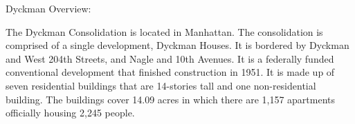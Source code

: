 Dyckman Overview: 

  

The Dyckman Consolidation is located in Manhattan. The consolidation is comprised of a single development, Dyckman Houses. It is bordered by Dyckman and West 204th Streets, and Nagle and 10th Avenues. It is a federally funded conventional development that finished construction in 1951. It is made up of seven residential buildings that are 14-stories tall and one non-residential building. The buildings cover 14.09 acres in which there are 1,157 apartments officially housing 2,245 people.   